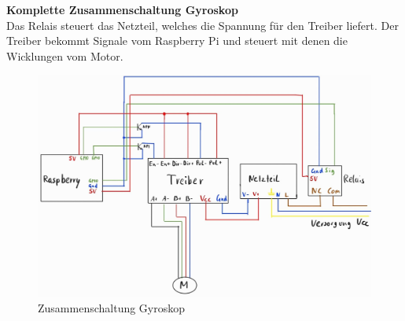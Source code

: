 \textbf{Komplette Zusammenschaltung Gyroskop}\\
\vspace{3mm}
Das Relais steuert das Netzteil, welches die Spannung für den Treiber liefert. Der Treiber bekommt Signale vom Raspberry Pi und steuert mit denen die Wicklungen vom Motor. \\
\vspace{3mm}
\begin{figure}[H]
    \centering
    \includegraphics[scale=0.2]{image/zusammengyros.jpeg}
    \caption{Zusammenschaltung Gyroskop}
    \label{fig:enter-label}
\end{figure}





\newpage

